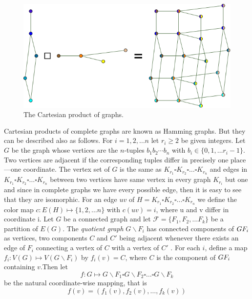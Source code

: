 \documentclass[12pt,a4paper,titlepage,openany]{report}
\begin{document}
\begin{figure}
\centering
\includegraphics[scale=0.45]{figures/Graph-Cartesian-product.png}
\caption{The Cartesian product of graphs.}

\end{figure}
Cartesian products of complete graphs are known as Hamming graphs. But they can be described also as follows. For
$i=1,2,\ldots n$ let $r_i\geq 2$ be given integers. Let $G$ be the graph whose vertices are the $n$-tuples $b_1b_2\cdots b_n$ with $b_i\in \{0,1,\ldots r_i-1\}$. Two vertices are adjacent if the corresponding tuples differ in precisely one place—one coordinate. The vertex set of $G$ is the same as $K_{r_1}\square K_{r_2}\square \ldots \square K_{r_n}$ and edges in $K_{r_1}\square K_{r_2}\square \ldots \square K_{r_n}$ between two vertices have same vertex in every graph $K_{r_i}$ but one and since in complete graphs we have every possible edge, then it is easy to see that they are isomorphic. For an edge $uv$ of
$H=K_{r_1}\square K_{r_2}\square \ldots \square K_{r_n}$ we define the color map $c:E(H)\mapsto \{1,2,\ldots n\}$ with $c(uv)=i$, where u and v differ in coordinate i.
\newline
Let $G$ be a connected graph and let $\mathcal{F}=\{F_1,F_2,\ldots F_k\}$ be a partition of $E(G)$. The \textit{quotient graph} $G\backslash F_i$ has connected components of $G\\F_i$ as vertices, two components $C$ and $C'$ being adjacent whenever there exists an edge of $F_i$ connecting a vertex of $C$ with a vertex of $C'$ . For each $i$, define a map $f_i:V(G)\mapsto V(G\backslash F_i)$ by $f_i(v)=C$, where $C$ is the component of $G\\F_i$ containing $v$.Then let
$$f:G\mapsto G\backslash F_1\square G\backslash F_2\square \ldots \square G\backslash F_k$$
be the natural coordinate-wise mapping, that is
$$f(v)=(f_1(v),f_2(v),\ldots , f_k(v))$$
\end{document}
